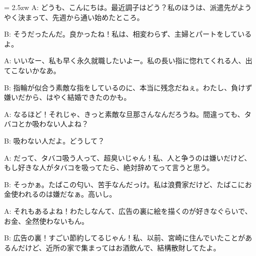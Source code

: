 \documentclass[11pt]{amsart}
\title{}
\author{}
\newenvironment{hangall}[1]{\hangindent = 2.5zw\everypar{\hangindent = 2.5zw}}{}
\begin{document}
\maketitle
\begin{hangall}{}%
A: どうも、こんにちは。最近調子はどう？私のほうは、派遣先がようやく決まって、先週から通い始めたところ。

B: そうだったんだ。良かったね！私は、相変わらず、主婦とパートをしているよ。

A: いいなー、私も早く永久就職したいよー。私の長い指に惚れてくれる人、出てこないかなあ。

B: 指輪が似合う素敵な指をしているのに、本当に残念だねぇ。わたし、負けず嫌いだから、はやく結婚できたのかも。

A: なるほど！それじゃ、きっと素敵な旦那さんなんだろうね。間違っても、タバコとか吸わない人よね？

B: 吸わない人だよ。どうして？

A: だって、タバコ吸う人って、超臭いじゃん！私、人と争うのは嫌いだけど、もし好きな人がタバコを吸ってたら、絶対辞めてって言うと思う。

B: そっかぁ。たばこの匂い、苦手なんだっけ。私は浪費家だけど、たばこにお金使われるのは嫌だなぁ。高いし。

A: それもあるよね！わたしなんて、広告の裏に絵を描くのが好きなぐらいで、お金、全然使わないもん。

B: 広告の裏！すごい節約してるじゃん！私、以前、宮崎に住んでいたことがあるんだけど、近所の家で集まってはお酒飲んで、結構散財してたよ。
\end{hangall}
\end{document}

